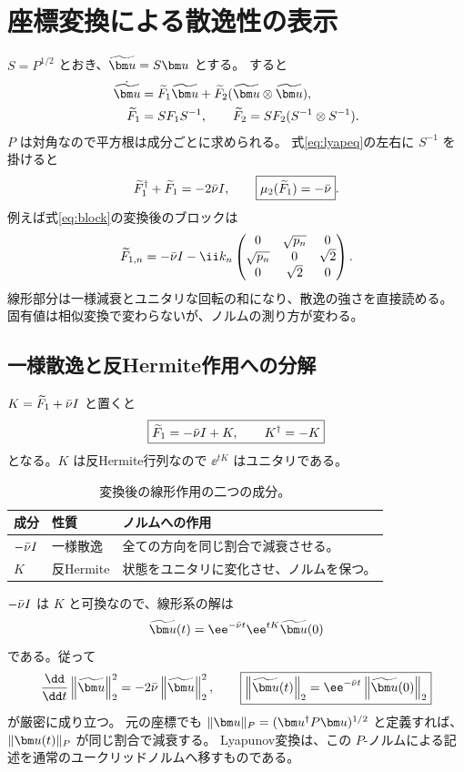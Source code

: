 \section{座標変換による散逸性の表示}
$S=P^{1/2}$ とおき、$\tu=S\uu$ とする。
すると
\begin{align}
\dot\tu&=\widetilde F_1\tu+\widetilde F_2(\tu\otimes\tu),\\
\widetilde F_1&=SF_1S^{-1},\qquad
\widetilde F_2=SF_2(S^{-1}\otimes S^{-1}).
\label{eq:transform}
\end{align}
$P$ は対角なので平方根は成分ごとに求められる。
式\eqref{eq:lyapeq}の左右に $S^{-1}$ を掛けると
\[
\widetilde F_1^\dagger+\widetilde F_1=-2\bar\nu I,
\qquad \boxed{\mu_2(\widetilde F_1)=-\bar\nu}.
\]
例えば式\eqref{eq:block}の変換後のブロックは
\[
\widetilde F_{1,n}=-\nuu I-\ii k_n
\begin{pmatrix}0&\sqrt{p_n}&0\\\sqrt{p_n}&0&\sqrt2\\0&\sqrt2&0\end{pmatrix}.
\]
線形部分は一様減衰とユニタリな回転の和になり、散逸の強さを直接読める。
固有値は相似変換で変わらないが、ノルムの測り方が変わる。

\subsection{一様散逸と反Hermite作用への分解}
$K=\widetilde F_1+\bar\nu I$ と置くと
\[
\boxed{\widetilde F_1=-\bar\nu I+K,\qquad K^\dagger=-K}
\]
となる。$K$ は反Hermite行列なので $\ee^{tK}$ はユニタリである。
\begin{table}[htbp]
\centering\small
\caption{変換後の線形作用の二つの成分。}
\begin{tabularx}{\textwidth}{llX}
\toprule 成分 & 性質 & ノルムへの作用 \\\midrule
$-\bar\nu I$ & 一様散逸 & 全ての方向を同じ割合で減衰させる。\\
$K$ & 反Hermite & 状態をユニタリに変化させ、ノルムを保つ。\\
\bottomrule
\end{tabularx}
\end{table}

$-\bar\nu I$ は $K$ と可換なので、線形系の解は
\[
\tu(t)=\ee^{-\nuu t}\ee^{tK}\tu(0)
\]
である。従って
\[
\frac{\dd}{\dd t}\normtwo{\tu}^2=-2\nuu\normtwo{\tu}^2,\qquad
\boxed{\normtwo{\tu(t)}=\ee^{-\nuu t}\normtwo{\tu(0)}}
\]
が厳密に成り立つ。
元の座標でも $\|\uu\|_P=(\uu^\dagger P\uu)^{1/2}$ と定義すれば、$\|\uu(t)\|_P$ が同じ割合で減衰する。
Lyapunov変換は、この $P$-ノルムによる記述を通常のユークリッドノルムへ移すものである。


